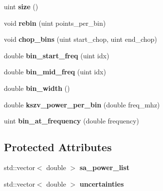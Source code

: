 \begin{DoxyCompactItemize}
\item 
uint {\bfseries size} ()\hypertarget{class_single_spectrum_a42c2d13e632ffc2d4f0931376c5b6e5b}{}\label{class_single_spectrum_a42c2d13e632ffc2d4f0931376c5b6e5b}

\item 
void {\bfseries rebin} (uint points\+\_\+per\+\_\+bin)\hypertarget{class_single_spectrum_ac39957d9b67a322272d1089aa6dd6c4c}{}\label{class_single_spectrum_ac39957d9b67a322272d1089aa6dd6c4c}

\item 
void {\bfseries chop\+\_\+bins} (uint start\+\_\+chop, uint end\+\_\+chop)\hypertarget{class_single_spectrum_afea78595e8232ecb15f3c2f5d825cef1}{}\label{class_single_spectrum_afea78595e8232ecb15f3c2f5d825cef1}

\item 
double {\bfseries bin\+\_\+start\+\_\+freq} (uint idx)\hypertarget{class_single_spectrum_a2bda515f49feea97f76bd06f441a9c2d}{}\label{class_single_spectrum_a2bda515f49feea97f76bd06f441a9c2d}

\item 
double {\bfseries bin\+\_\+mid\+\_\+freq} (uint idx)\hypertarget{class_single_spectrum_a0a1e03366e1b482decd42326187cdcf5}{}\label{class_single_spectrum_a0a1e03366e1b482decd42326187cdcf5}

\item 
double {\bfseries bin\+\_\+width} ()\hypertarget{class_single_spectrum_aad6dfbabe270fbc5ac7ce0dafdb77197}{}\label{class_single_spectrum_aad6dfbabe270fbc5ac7ce0dafdb77197}

\item 
double {\bfseries kszv\+\_\+power\+\_\+per\+\_\+bin} (double freq\+\_\+mhz)\hypertarget{class_single_spectrum_a9944b692eebbb9e032a4ce44f63c37fe}{}\label{class_single_spectrum_a9944b692eebbb9e032a4ce44f63c37fe}

\item 
uint {\bfseries bin\+\_\+at\+\_\+frequency} (double frequency)\hypertarget{class_single_spectrum_a98378d6007966e7706624f55ea35b975}{}\label{class_single_spectrum_a98378d6007966e7706624f55ea35b975}

\end{DoxyCompactItemize}
\subsection*{Protected Attributes}
\begin{DoxyCompactItemize}
\item 
std\+::vector$<$ double $>$ {\bfseries sa\+\_\+power\+\_\+list}\hypertarget{class_single_spectrum_a5aca204ca152d33748820e473955a1b0}{}\label{class_single_spectrum_a5aca204ca152d33748820e473955a1b0}

\item 
std\+::vector$<$ double $>$ {\bfseries uncertainties}\hypertarget{class_single_spectrum_ad2c19bf0653a56f7d21709f5b8796b67}{}\label{class_single_spectrum_ad2c19bf0653a56f7d21709f5b8796b67}

\end{DoxyCompactItemize}
